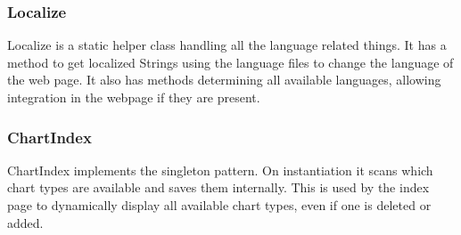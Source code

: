 \subsubsection*{Localize}
Localize is a static helper class handling all the language related things. 
It has a method to get localized Strings using the language files to change the language of the web page.
It also has methods determining all available languages, allowing integration in the webpage if they are present.

\subsubsection*{ChartIndex}
ChartIndex implements the singleton pattern. On instantiation it scans which chart types are available 
and saves them internally. This is used by the index page to dynamically display all available chart types,
even if one is deleted or added.


